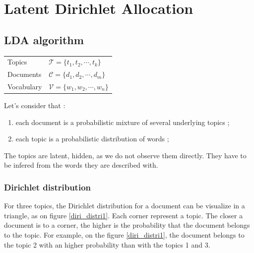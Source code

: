 \documentclass[a4paper,twoside,12pt,openright]{report}
\begin{document}
\newpage
\section{Latent Dirichlet Allocation}

\subsection{LDA algorithm}

\begin{center}
\begin{tabular}{ll}
Topics & $ \mathcal{T} = \{t_1,t_2,\cdots,t_k\} $ \\
Documents & $ \mathcal{C} = \{d_1,d_2,\cdots,d_m\} $ \\
Vocabulary & $ \mathcal{V} = \{w_1,w_2,\cdots,w_n\} $ \\
\end{tabular}
\end{center}

Let's consider that : 
\begin{enumerate}
\item each document is a probabilistic mixture of several underlying topics ;
\item each topic is a probabilistic distribution of words ;
\end{enumerate}

The topics are latent, hidden, as we do not observe them directly. They have to be infered from the words they are described with.

\subsubsection{Dirichlet distribution}
For three topics, the Dirichlet distribution for a document can be visualize in a triangle, as on figure \ref{diri_distri1}. Each corner represent a topic. The closer a document is to a corner, the higher is the probability that the document belongs to the topic. For example, on the figure \ref{diri_distri1}, the document belongs to the topic 2 with an higher probability than with the topics 1 and 3.
\end{document}
